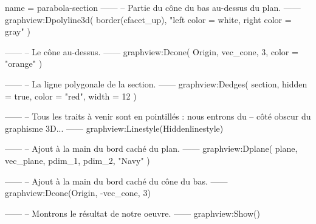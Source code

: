 \documentclass[border = 3pt]{standalone}
\begin{document}
\begin{luadraw*}{name = parabola-section}
------
-- Partie du cône du bas au-dessus du plan.
------
graphview:Dpolyline3d(
  border(cfacet_up),
  "left color = white, right color = gray"
)

------
-- Le cône au-dessus.
------
graphview:Dcone(
  Origin, vec_cone, 3,
  {
    color = "orange"
  }
)

------
-- La ligne polygonale de la section.
------
graphview:Dedges(
  section,
  {
    hidden = true, color = "red", width = 12
  }
)

------
-- Tous les traits à venir sont en pointillés : nous entrons du
-- côté obscur du graphisme 3D...
------
graphview:Linestyle(Hiddenlinestyle)

------
-- Ajout à la main du bord caché du plan.
------
graphview:Dplane(
  plane,
  vec_plane, pdim_1, pdim_2,
  "Navy"
)

------
-- Ajout à la main du bord caché du cône du bas.
------
graphview:Dcone(Origin, -vec_cone, 3)

------
-- Montrons le résultat de notre oeuvre.
------
graphview:Show()
\end{luadraw*}
\end{document}

